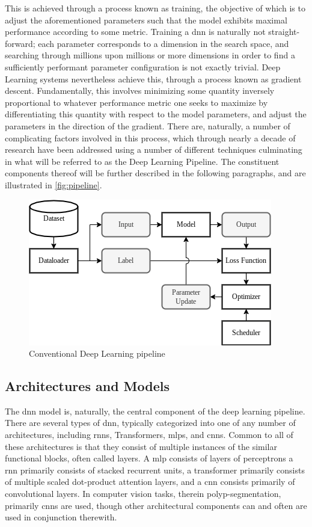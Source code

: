     This is achieved through a process known as training, the objective of which is to adjust the aforementioned parameters such that the model exhibits maximal performance according to some metric. Training a \gls{dnn} is naturally not straight-forward; each parameter corresponds to a dimension in the search space, and searching through millions upon millions or more dimensions in order to find a sufficiently performant parameter configuration is not exactly trivial. Deep Learning systems nevertheless achieve this, through a process known as gradient descent. Fundamentally, this involves minimizing some quantity inversely proportional to whatever performance metric one seeks to maximize by differentiating this quantity with respect to the model parameters, and adjust the parameters in the direction of the gradient. There are, naturally, a number of complicating factors involved in this process, which through nearly a decade of research have been addressed using a number of different techniques culminating in what will be referred to as the Deep Learning Pipeline. The constituent components thereof will be further described in the following paragraphs, and are illustrated in \autoref{fig:pipeline}. 
    
    \begin{figure}[h]
        \centering
        \includegraphics[width=0.75\linewidth]{illustrations/pipeline.png}
        \caption{Conventional Deep Learning pipeline}
        \label{fig:pipeline}
    \end{figure}
    
    \subsection{Architectures and Models}
        The \gls{dnn} model is, naturally, the central component of the deep learning pipeline. There are several types of \gls{dnn}, typically categorized into one of any number of architectures, including \glspl{rnn}, Transformers, \glspl{mlp}, and \glspl{cnn}. Common to all of these architectures is that they consist of multiple instances of the similar functional blocks, often called layers. A \gls{mlp} consists of layers of perceptrons a \gls{rnn} primarily consists of stacked recurrent units, a transformer primarily consists of multiple scaled dot-product attention layers, and a \gls{cnn} consists primarily of convolutional layers. In computer vision tasks, therein polyp-segmentation, primarily  \glspl{cnn} are used, though other architectural components can and often are used in conjunction therewith.
        
